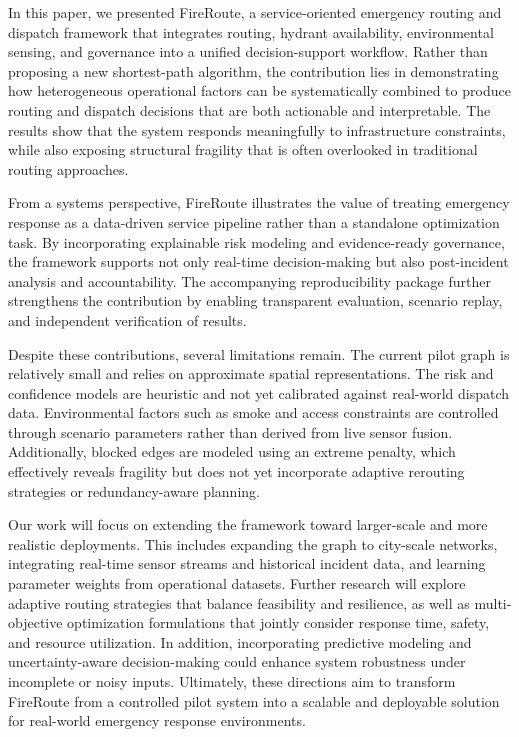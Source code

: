 In this paper, we presented FireRoute, a service-oriented emergency routing and dispatch framework that integrates routing, hydrant availability, environmental sensing, and governance into a unified decision-support workflow. Rather than proposing a new shortest-path algorithm, the contribution lies in demonstrating how heterogeneous operational factors can be systematically combined to produce routing and dispatch decisions that are both actionable and interpretable. The results show that the system responds meaningfully to infrastructure constraints, while also exposing structural fragility that is often overlooked in traditional routing approaches.

From a systems perspective, FireRoute illustrates the value of treating emergency response as a data-driven service pipeline rather than a standalone optimization task. By incorporating explainable risk modeling and evidence-ready governance, the framework supports not only real-time decision-making but also post-incident analysis and accountability. The accompanying reproducibility package further strengthens the contribution by enabling transparent evaluation, scenario replay, and independent verification of results.

Despite these contributions, several limitations remain. The current pilot graph is relatively small and relies on approximate spatial representations. The risk and confidence models are heuristic and not yet calibrated against real-world dispatch data. Environmental factors such as smoke and access constraints are controlled through scenario parameters rather than derived from live sensor fusion. Additionally, blocked edges are modeled using an extreme penalty, which effectively reveals fragility but does not yet incorporate adaptive rerouting strategies or redundancy-aware planning.

Our work will focus on extending the framework toward larger-scale and more realistic deployments. This includes expanding the graph to city-scale networks, integrating real-time sensor streams and historical incident data, and learning parameter weights from operational datasets. Further research will explore adaptive routing strategies that balance feasibility and resilience, as well as multi-objective optimization formulations that jointly consider response time, safety, and resource utilization. In addition, incorporating predictive modeling and uncertainty-aware decision-making could enhance system robustness under incomplete or noisy inputs. Ultimately, these directions aim to transform FireRoute from a controlled pilot system into a scalable and deployable solution for real-world emergency response environments.